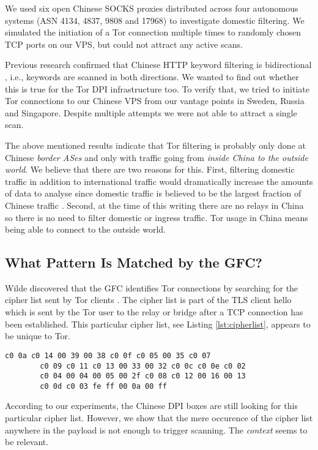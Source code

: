 \documentclass[runningheads,a4paper]{llncs}
\begin{document}
We used six open Chinese SOCKS proxies distributed across four autonomous systems (ASN 4134, 4837,
9808 and 17968) to investigate domestic filtering. We simulated the initiation of a Tor connection
multiple times to randomly chosen TCP ports on our VPS, but could not attract any active scans.

Previous research confirmed that Chinese HTTP keyword filtering is bidirectional \cite{Clayton2006},
i.e., keywords are scanned in both directions. We wanted to find out whether this is true for the
Tor DPI infrastructure too. To verify that, we tried to initiate Tor connections to our Chinese VPS
from our vantage points in Sweden, Russia and Singapore. Despite multiple attempts we were not able
to attract a single scan.

The above mentioned results indicate that Tor filtering is probably only done at Chinese
\emph{border ASes} and only with traffic going from \emph{inside China to the outside world}. We
believe that there are two reasons for this. First, filtering domestic traffic in addition to
international traffic would dramatically increase the amounts of data to analyse since domestic
traffic is believed to be the largest fraction of Chinese traffic \cite{hroberts}. Second, at the
time of this writing there are no relays in China so there is no need to filter domestic or ingress
traffic. Tor usage in China means being able to connect to the outside world.

\subsection{What Pattern Is Matched by the GFC?}
Wilde discovered that the GFC identifies Tor connections by searching for the cipher list sent by
Tor clients \cite{twilde}. The cipher list is part of the TLS client hello which is sent by the Tor
user to the relay or bridge after a TCP connection has been established. This particular cipher
list, see Listing \ref{lst:cipherlist}, appears to be unique to Tor.

\begin{lstlisting}[basicstyle=\footnotesize\ttfamily,caption={Tor cipher list inside TLS client
hello.},label={lst:cipherlist},captionpos=b]
        c0 0a c0 14 00 39 00 38 c0 0f c0 05 00 35 c0 07
        c0 09 c0 11 c0 13 00 33 00 32 c0 0c c0 0e c0 02
        c0 04 00 04 00 05 00 2f c0 08 c0 12 00 16 00 13
        c0 0d c0 03 fe ff 00 0a 00 ff
\end{lstlisting}

According to our experiments, the Chinese DPI boxes are still looking for this particular cipher
list. However, we show that the mere occurence of the cipher list anywhere in the payload is not
enough to trigger scanning. The \emph{context} seems to be relevant.
\end{document}
